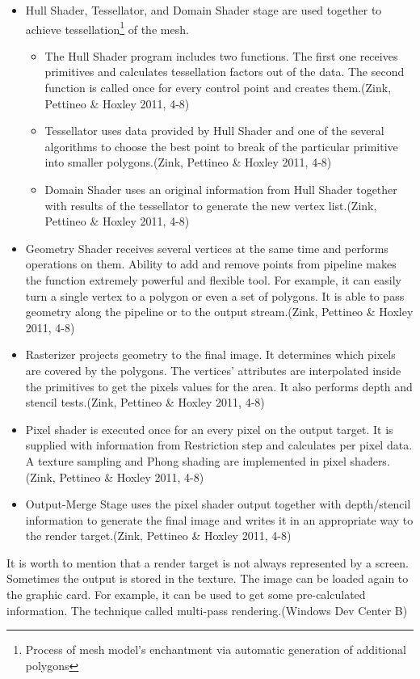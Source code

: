 \documentclass[twoside, english, 11pt]{report}
\begin{document}
\begin{itemize}
\item Hull Shader, Tessellator, and Domain Shader stage are used together to achieve tessellation\footnote{Process of mesh model's enchantment via automatic generation of additional polygons} of the mesh.
  \begin{itemize}
    \item The Hull Shader program includes two functions. The first one receives primitives and calculates tessellation factors out of the data. The second function is called once for every control point and creates them.(Zink, Pettineo \& Hoxley 2011, 4-8)
    \item Tessellator uses data provided by Hull Shader and one of the several algorithms to choose the best point to break of the particular primitive into smaller polygons.(Zink, Pettineo \& Hoxley 2011, 4-8)
    \item Domain Shader uses an original information from Hull Shader together with results of the tessellator to generate the new vertex list.(Zink, Pettineo \& Hoxley 2011, 4-8)
  \end{itemize}
\item Geometry Shader receives several vertices at the same time and performs operations on them. Ability to add and remove points from pipeline makes the function extremely powerful and flexible tool. For example, it can easily turn a single vertex to a polygon or even a set of polygons. It is able to pass geometry along the pipeline or to the output stream.(Zink, Pettineo \& Hoxley 2011, 4-8)
\item Rasterizer projects geometry to the final image. It determines which pixels are covered by the polygons. The vertices' attributes are interpolated inside the primitives to get the pixels values for the area. It also performs depth and stencil tests.(Zink, Pettineo \& Hoxley 2011, 4-8)
\item Pixel shader is executed once for an every pixel on the output target. It is supplied with information from Restriction step and calculates per pixel data. A texture sampling and Phong shading are implemented in pixel shaders.(Zink, Pettineo \& Hoxley 2011, 4-8)
\item Output-Merge Stage uses the pixel shader output together with depth/stencil information to generate the final image and writes it in an appropriate way to the render target.(Zink, Pettineo \& Hoxley 2011, 4-8)
\end{itemize}

It is worth to mention that a render target is not always represented by a screen. Sometimes the output is stored in the texture. The image can be loaded again to the graphic card. For example, it can be used to get some pre-calculated information. The technique called multi-pass rendering.(Windows Dev Center B)
\end{document}
